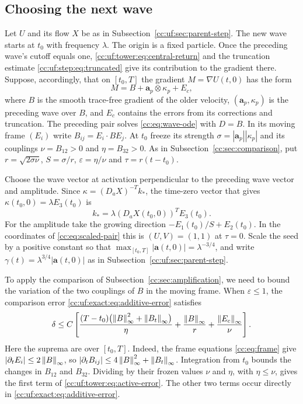 \subsection{Choosing the next wave}\label{cc:uf:sec:later-wave}
Let $U$ and its flow $X$ be as in Subsection~\ref{cc:uf:sec:parent-step}.
The new wave starts at $t_0$ with frequency $\lambda$. The origin is a
fixed particle. Once the preceding wave's cutoff
equals one, \eqref{cc:uf:tower:eq:central-return} and the truncation
estimate \eqref{cc:uf:step:eq:truncated} give its contribution to the
gradient there. Suppose, accordingly, that on $[t_0,T]$ the gradient
$M=\nabla U(t,0)$ has the form
\begin{equation}\label{cc:uf:tower:eq:split}
 M=B+\mathbf a_p\otimes\kappa_p+E_c ,
\end{equation}
where $B$ is the smooth trace-free gradient of the older velocity, $(\mathbf a_p,\kappa_p)$ is
the preceding wave over $B$, and $E_c$ contains the errors from its
corrections and truncation. The preceding pair solves
\eqref{cc:eq:wave-ode} with $D=B$. In its moving frame $(E_i)$ write
$B_{ij}=E_i\cdot BE_j$. At $t_0$ freeze its strength
$\sigma=|\mathbf a_p||\kappa_p|$ and its couplings $\nu=B_{12}>0$ and
$\eta=B_{32}>0$. As in Subsection~\ref{cc:sec:comparison}, put
$r=\sqrt{2\sigma\nu}$, $S=\sigma/r$, $\varepsilon=\eta/\nu$ and
$\tau=r(t-t_0)$.

Choose the wave vector at activation perpendicular to the preceding
wave vector and amplitude. Since $\kappa=(D_aX)^{-T}k_*$, the
time-zero vector that gives $\kappa(t_0,0)=\lambda E_3(t_0)$ is
\[
 k_*=\lambda (D_aX(t_0,0))^TE_3(t_0).
\]
For the amplitude take the growing direction
$-E_1(t_0)/S+E_2(t_0)$. In the coordinates of \eqref{cc:eq:scaled-pair}
this is $(U,V)=(1,1)$ at $\tau=0$. Scale the seed by a positive
constant so that $\max_{[t_0,T]}|\mathbf a(t,0)|=\lambda^{-3/4}$, and
write $\gamma(t)=\lambda^{3/4}|\mathbf a(t,0)|$ as in
Subsection~\ref{cc:uf:sec:parent-step}.

To apply the comparison of Subsection~\ref{cc:sec:amplification}, we need
to bound the variation of the two couplings of $B$ in the moving frame.
When $\varepsilon\le1$, the comparison error
\eqref{cc:uf:exact:eq:additive-error} satisfies
\begin{equation}\label{cc:uf:tower:eq:active-error}
 \delta\le C\left[
 \frac{(T-t_0)\bigl(\left\lVert B\right\rVert_\infty^2+\left\lVert B_t\right\rVert_\infty\bigr)}{\eta}
 +\frac{\left\lVert B\right\rVert_\infty}{r}+\frac{\left\lVert E_c\right\rVert_\infty}{\nu}\right].
\end{equation}
Here the suprema are over $[t_0,T]$. Indeed, the frame equations
\eqref{cc:eq:frame} give $|\partial_t E_i|\le2\left\lVert B\right\rVert_\infty$, so
$|\partial_t B_{ij}|\le4\left\lVert B\right\rVert_\infty^2+\left\lVert B_t\right\rVert_\infty$.
Integration from $t_0$ bounds the changes in $B_{12}$ and $B_{32}$.
Dividing by their frozen values $\nu$ and $\eta$, with $\eta\le\nu$,
gives the first term of \eqref{cc:uf:tower:eq:active-error}. The other
two terms occur directly in \eqref{cc:uf:exact:eq:additive-error}.

